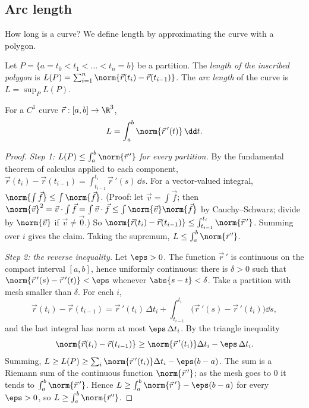 \subsection{Arc length}

How long is a curve? We define length by approximating the curve with a polygon.

\begin{definition}
Let $P=\{a=t_0<t_1<\dots<t_n=b\}$ be a partition. The \emph{length of the inscribed polygon} is $L(P)=\sum_{i=1}^n\norm{\vec r(t_i)-\vec r(t_{i-1})}$. The \emph{arc length} of the curve is $L=\sup_P L(P)$.
\end{definition}

\begin{theorem}\label{thm:arclength}
For a $C^1$ curve $\vec r:[a,b]\to\R^3$,
\[
L=\int_a^b\norm{\vec r\,'(t)}\,\dd t .
\]
\end{theorem}

\begin{proof}
\emph{Step 1: $L(P)\le\int_a^b\norm{\vec r\,'}$ for every partition.} By the fundamental theorem of calculus applied to each component, $\vec r(t_i)-\vec r(t_{i-1})=\int_{t_{i-1}}^{t_i}\vec r\,'(s)\,\dd s$. For a vector-valued integral, $\norm{\int\vec f}\le\int\norm{\vec f}$. (Proof: let $\vec v=\int\vec f$; then $\norm{\vec v}^2=\vec v\cdot\int\vec f=\int\vec v\cdot\vec f\le\int\norm{\vec v}\norm{\vec f}$ by Cauchy--Schwarz; divide by $\norm{\vec v}$ if $\vec v\ne\vec 0$.) So $\norm{\vec r(t_i)-\vec r(t_{i-1})}\le\int_{t_{i-1}}^{t_i}\norm{\vec r\,'}$. Summing over $i$ gives the claim. Taking the supremum, $L\le\int_a^b\norm{\vec r\,'}$.

\emph{Step 2: the reverse inequality.} Let $\eps>0$. The function $\vec r\,'$ is continuous on the compact interval $[a,b]$, hence uniformly continuous: there is $\delta>0$ such that $\norm{\vec r\,'(s)-\vec r\,'(t)}<\eps$ whenever $\abs{s-t}<\delta$. Take a partition with mesh smaller than $\delta$. For each $i$,
\[
\vec r(t_i)-\vec r(t_{i-1})=\vec r\,'(t_i)\,\Delta t_i+\int_{t_{i-1}}^{t_i}\bigl(\vec r\,'(s)-\vec r\,'(t_i)\bigr)\dd s,
\]
and the last integral has norm at most $\eps\,\Delta t_i$. By the triangle inequality
\[
\norm{\vec r(t_i)-\vec r(t_{i-1})}\ge\norm{\vec r\,'(t_i)}\Delta t_i-\eps\,\Delta t_i .
\]
Summing, $L\ge L(P)\ge\sum_i\norm{\vec r\,'(t_i)}\Delta t_i-\eps(b-a)$. The sum is a Riemann sum of the continuous function $\norm{\vec r\,'}$; as the mesh goes to $0$ it tends to $\int_a^b\norm{\vec r\,'}$. Hence $L\ge\int_a^b\norm{\vec r\,'}-\eps(b-a)$ for every $\eps>0$, so $L\ge\int_a^b\norm{\vec r\,'}$.
\end{proof}


